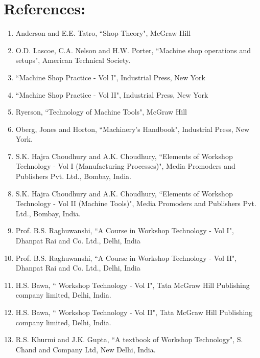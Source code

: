 \section*{References:}
\begin{enumerate}
    \item Anderson and E.E. Tatro, ``Shop Theory", McGraw Hill
    \item O.D. Lascoe, C.A. Nelson and H.W. Porter, ``Machine shop operations and setups", American Technical Society.
    \item ``Machine Shop Practice - Vol I", Industrial Press, New York
     \item ``Machine Shop Practice - Vol II", Industrial Press, New York
    \item Ryerson, ``Technology of Machine Tools", McGraw Hill
    \item Oberg, Jones and Horton, ``Machinery's Handbook", Industrial Press, New York.
    \item S.K. Hajra Choudhury and A.K. Choudhury, ``Elements of Workshop Technology - Vol I (Manufacturing Processes)", Media Promoders and Publishers Pvt. Ltd., Bombay, India.
    \item S.K. Hajra Choudhury and A.K. Choudhury, ``Elements of Workshop Technology - Vol II (Machine Tools)", Media Promoders and Publishers Pvt. Ltd., Bombay, India.
    \item Prof. B.S. Raghuwanshi, ``A Course in Workshop Technology - Vol I", Dhanpat Rai and Co. Ltd., Delhi, India
    \item Prof. B.S. Raghuwanshi, ``A Course in Workshop Technology - Vol II", Dhanpat Rai and Co. Ltd., Delhi, India
    \item H.S. Bawa, `` Workshop Technology - Vol I", Tata McGraw Hill Publishing company limited, Delhi, India.
    \item H.S. Bawa, `` Workshop Technology - Vol II", Tata McGraw Hill Publishing company limited, Delhi, India.
    \item R.S. Khurmi and J.K. Gupta, ``A textbook of Workshop Technology", S. Chand and Company Ltd, New Delhi, India.
\end{enumerate}